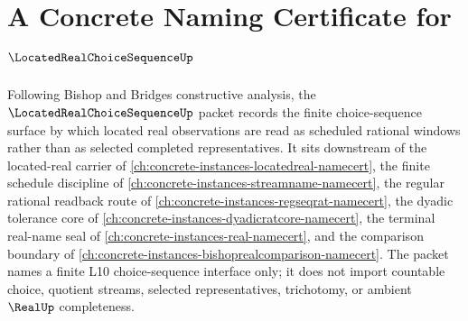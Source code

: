 \chapter{A Concrete Naming Certificate for $\LocatedRealChoiceSequenceUp$}
\label{ch:concrete-instances-located-real-choice-sequence-namecert}

Following Bishop and Bridges constructive analysis, the $\LocatedRealChoiceSequenceUp$ packet records the finite choice-sequence surface by which located real observations are read as scheduled rational windows rather than as selected completed representatives. It sits downstream of the located-real carrier of \autoref{ch:concrete-instances-locatedreal-namecert}, the finite schedule discipline of \autoref{ch:concrete-instances-streamname-namecert}, the regular rational readback route of \autoref{ch:concrete-instances-regseqrat-namecert}, the dyadic tolerance core of \autoref{ch:concrete-instances-dyadicratcore-namecert}, the terminal real-name seal of \autoref{ch:concrete-instances-real-namecert}, and the comparison boundary of \autoref{ch:concrete-instances-bishoprealcomparison-namecert}. The packet names a finite L10 choice-sequence interface only; it does not import countable choice, quotient streams, selected representatives, trichotomy, or ambient $\RealUp$ completeness.

